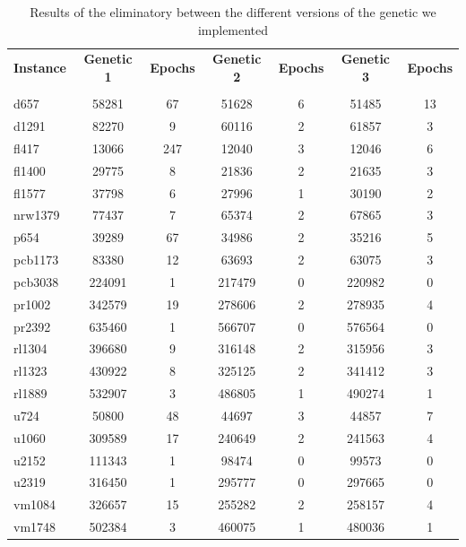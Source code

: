 \begin{table}[h!]
	\begin{center}
		\begin{tabular}{l|c|c|c|c|c|c}
			\textbf{Instance} & \textbf{Genetic 1} & \textbf{Epochs} & \textbf{Genetic 2} & \textbf{Epochs} & \textbf{Genetic 3} & \textbf{Epochs}\\
			& & & & & & \\
			\hline
			d657 & 58281 & 67 & 51628 & 6 & 51485 & 13 \\
			d1291 & 82270 & 9 & 60116 & 2 & 61857 & 3 \\
			fl417 & 13066 & 247 & 12040 & 3 & 12046 & 6 \\
			fl1400 & 29775 & 8 & 21836 & 2 & 21635 & 3 \\
			fl1577 & 37798 & 6 & 27996 & 1 & 30190 & 2 \\
			nrw1379 & 77437 & 7 & 65374 & 2 & 67865 & 3 \\
			p654 & 39289 & 67 & 34986 & 2 & 35216 & 5 \\
			pcb1173 & 83380 & 12 & 63693 & 2 & 63075 & 3 \\
			pcb3038 & 224091 & 1 & 217479 & 0 & 220982 & 0 \\
			pr1002 & 342579 & 19 & 278606 & 2 & 278935 & 4 \\
			pr2392 & 635460 & 1 & 566707 & 0 & 576564 & 0 \\
			rl1304 & 396680 & 9 & 316148 & 2 & 315956 & 3 \\
			rl1323 & 430922 & 8 & 325125 & 2 & 341412 & 3 \\
			rl1889 & 532907 & 3 & 486805 & 1 & 490274 & 1 \\
			u724 & 50800 & 48 & 44697 & 3 & 44857 & 7 \\
			u1060 & 309589 & 17 & 240649 & 2 & 241563 & 4 \\
			u2152 & 111343 & 1 & 98474 & 0 & 99573 & 0 \\
			u2319 & 316450 & 1 & 295777 & 0 & 297665 & 0 \\
			vm1084 & 326657 & 15 & 255282 & 2 & 258157 & 4 \\
			vm1748 & 502384 & 3 & 460075 & 1 & 480036 & 1 \\
		\end{tabular}
		\caption{Results of the eliminatory between the different versions of the genetic we implemented}
		\label{tab:meta}
	\end{center}
\end{table}

